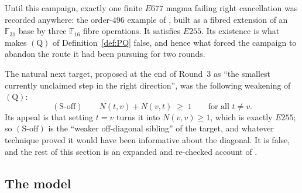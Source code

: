 \documentclass[11pt]{article}
\theoremstyle{plain}
\theoremstyle{definition}
\theoremstyle{remark}
\numberwithin{equation}{section}
\newcommand{\F}{\mathbb{F}}
\begin{document}
Until this campaign, exactly one finite $E677$ magma failing right cancellation was recorded
anywhere: the order-$496$ example of \cite[\S13.1]{blueprint}, built as a fibred extension of
an $\F_{31}$ base by three $\F_{16}$ fibre operations. It satisfies $E255$. Its existence is
what makes $(\mathrm{Q})$ of Definition~\ref{def:PQ} false, and hence what forced the campaign
to abandon the route it had been pursuing for two rounds.

The natural next target, proposed at the end of Round~3 as ``the smallest currently
unclaimed step in the right direction'', was the following weakening of $(\mathrm{Q})$:
\[
  (\mathrm{S\text{-}off}) \qquad N(t,v) + N(v,t) \;\ge\; 1 \qquad \text{for all } t\ne v .
\]
Its appeal is that setting $t=v$ turns it into $N(v,v)\ge 1$, which is exactly $E255$; so
$(\mathrm{S\text{-}off})$ is the ``weaker off-diagonal sibling'' of the target, and whatever
technique proved it would have been informative about the diagonal. It is false, and the rest
of this section is an expanded and re-checked account of \cite{R5C}.

\subsection{The model}
\end{document}
